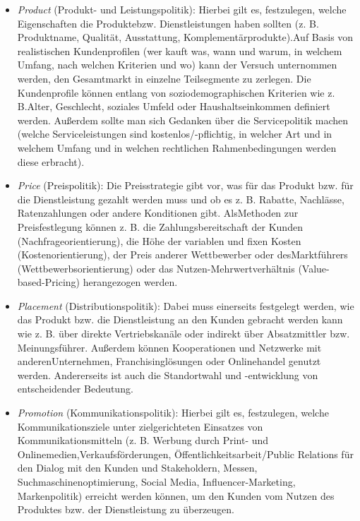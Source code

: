\documentclass[
  letterpaper,
]{book}
\begin{document}
\begin{itemize}
\item
  \emph{Product }(Produkt- und Leistungspolitik): Hierbei gilt es,
  festzulegen, welche Eigenschaften die Produktebzw. Dienstleistungen
  haben sollten (z. B. Produktname, Qualität, Ausstattung,
  Komplementärprodukte).Auf Basis von realistischen Kundenprofilen (wer
  kauft was, wann und warum, in welchem Umfang, nach welchen Kriterien
  und wo) kann der Versuch unternommen werden, den Gesamtmarkt in
  einzelne Teilsegmente zu zerlegen. Die Kundenprofile können entlang
  von soziodemographischen Kriterien wie z. B.Alter, Geschlecht,
  soziales Umfeld oder Haushaltseinkommen definiert werden. Außerdem
  sollte man sich Gedanken über die Servicepolitik machen (welche
  Serviceleistungen sind kostenlos/-pflichtig, in welcher Art und in
  welchem Umfang und in welchen rechtlichen Rahmenbedingungen werden
  diese erbracht).
\item
  \emph{Price }(Preispolitik): Die Preisstrategie gibt vor, was für das
  Produkt bzw. für die Dienstleistung gezahlt werden muss und ob es z.
  B. Rabatte, Nachlässe, Ratenzahlungen oder andere Konditionen gibt.
  AlsMethoden zur Preisfestlegung können z. B. die Zahlungsbereitschaft
  der Kunden (Nachfrageorientierung), die Höhe der variablen und fixen
  Kosten (Kostenorientierung), der Preis anderer Wettbewerber oder
  desMarktführers (Wettbewerbsorientierung) oder das
  Nutzen-Mehrwertverhältnis (Value-based-Pricing) herangezogen werden.
\item
  \emph{Placement }(Distributionspolitik): Dabei muss einerseits
  festgelegt werden, wie das Produkt bzw. die Dienstleistung an den
  Kunden gebracht werden kann wie z. B. über direkte Vertriebskanäle
  oder indirekt über Absatzmittler bzw. Meinungsführer. Außerdem können
  Kooperationen und Netzwerke mit anderenUnternehmen,
  Franchisinglösungen oder Onlinehandel genutzt werden. Andererseits ist
  auch die Standortwahl und -entwicklung von entscheidender Bedeutung.
\item
  \emph{Promotion }(Kommunikationspolitik): Hierbei gilt es,
  festzulegen, welche Kommunikationsziele unter zielgerichteten
  Einsatzes von Kommunikationsmitteln (z. B. Werbung durch Print- und
  Onlinemedien,Verkaufsförderungen, Öffentlichkeitsarbeit/Public
  Relations für den Dialog mit den Kunden und Stakeholdern, Messen,
  Suchmaschinenoptimierung, Social Media, Influencer-Marketing,
  Markenpolitik) erreicht werden können, um den Kunden vom Nutzen des
  Produktes bzw. der Dienstleistung zu überzeugen.
\end{itemize}
\end{document}
